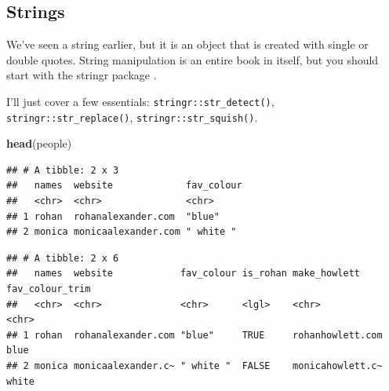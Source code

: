 \documentclass[
]{book}
\newenvironment{Shaded}{\begin{snugshade}}{\end{snugshade}}
\newcommand{\DataTypeTok}[1]{\textcolor[rgb]{0.13,0.29,0.53}{#1}}
\newcommand{\KeywordTok}[1]{\textcolor[rgb]{0.13,0.29,0.53}{\textbf{#1}}}
\newcommand{\NormalTok}[1]{#1}
\newcommand{\OperatorTok}[1]{\textcolor[rgb]{0.81,0.36,0.00}{\textbf{#1}}}
\newcommand{\StringTok}[1]{\textcolor[rgb]{0.31,0.60,0.02}{#1}}
\begin{document}
\hypertarget{strings}{%
\subsection{Strings}\label{strings}}

We've seen a string earlier, but it is an object that is created with single or double quotes. String manipulation is an entire book in itself, but you should start with the stringr package \citep{citestringr}.

I'll just cover a few essentials: \texttt{stringr::str\_detect()}, \texttt{stringr::str\_replace()}, \texttt{stringr::str\_squish()}.

\begin{Shaded}
\begin{Highlighting}[]
\KeywordTok{head}\NormalTok{(people)}
\end{Highlighting}
\end{Shaded}

\begin{verbatim}
## # A tibble: 2 x 3
##   names  website             fav_colour
##   <chr>  <chr>               <chr>     
## 1 rohan  rohanalexander.com  "blue"    
## 2 monica monicaalexander.com " white "
\end{verbatim}

\begin{Shaded}
\end{Shaded}

\begin{verbatim}
## # A tibble: 2 x 6
##   names  website            fav_colour is_rohan make_howlett     fav_colour_trim
##   <chr>  <chr>              <chr>      <lgl>    <chr>            <chr>          
## 1 rohan  rohanalexander.com "blue"     TRUE     rohanhowlett.com blue           
## 2 monica monicaalexander.c~ " white "  FALSE    monicahowlett.c~ white
\end{verbatim}
\end{document}
